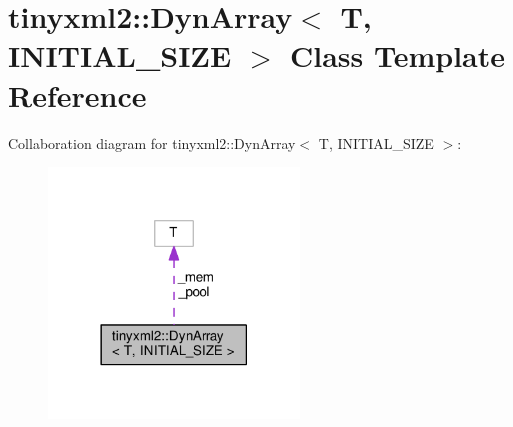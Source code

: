 \hypertarget{classtinyxml2_1_1DynArray}{}\section{tinyxml2\+:\+:Dyn\+Array$<$ T, I\+N\+I\+T\+I\+A\+L\+\_\+\+S\+I\+ZE $>$ Class Template Reference}
\label{classtinyxml2_1_1DynArray}


Collaboration diagram for tinyxml2\+:\+:Dyn\+Array$<$ T, I\+N\+I\+T\+I\+A\+L\+\_\+\+S\+I\+ZE $>$\+:
\nopagebreak
\begin{figure}[H]
\begin{center}
\leavevmode
\includegraphics[width=189pt]{classtinyxml2_1_1DynArray__coll__graph}
\end{center}
\end{figure}
